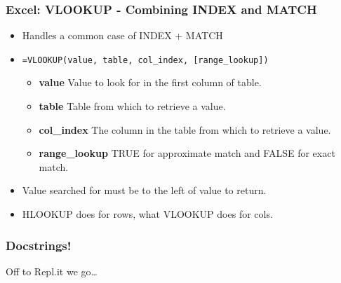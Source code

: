 \documentclass{beamer}
\begin{document}
%
%
\begin{frame}[fragile]
  \frametitle{Excel: VLOOKUP - Combining INDEX and MATCH}
  \begin{itemize}
    \item Handles a common case of INDEX + MATCH
    \item \lstinline|=VLOOKUP(value, table, col_index, [range_lookup])|
      \begin{itemize}
        \item \textbf{value} \textrightarrow  Value to look for in the first column of table.
        \item \textbf{table} \textrightarrow  Table from which to retrieve a value.
        \item \textbf{col\_index} \textrightarrow The column in the table from which to retrieve a value.
        \item \textbf{range\_lookup} \textrightarrow TRUE for approximate match and FALSE for exact match.
      \end{itemize}
      \item Value searched for must be to the left of value to return.
      \item HLOOKUP does for rows, what VLOOKUP does for cols.
  \end{itemize}
\end{frame}


%
%
\begin{frame}[fragile]
  \frametitle{Docstrings!}
  \centering
  Off to Repl.it we go\ldots
\end{frame}
\end{document}
